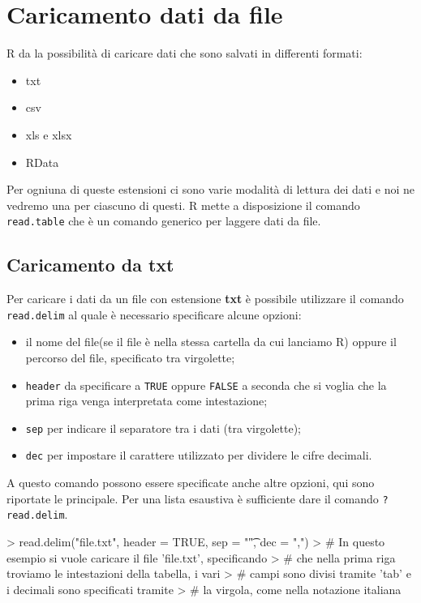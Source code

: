 \documentclass{article}
\begin{document}

\section{Caricamento dati da file}
R da la possibilità di caricare dati che sono salvati in differenti formati:
\begin{itemize}
  \item txt
  \item csv
  \item xls e xlsx
  \item RData
\end{itemize}
Per ogniuna di queste estensioni ci sono varie modalità di lettura dei dati e 
noi ne vedremo una per ciascuno di questi. R mette a disposizione il comando 
\texttt{read.table} che è un comando generico per laggere dati da file.

\subsection{Caricamento da txt}
Per caricare i dati da un file con estensione \textbf{txt} è possibile utilizzare
il comando \texttt{read.delim} al quale è necessario specificare alcune opzioni:
\begin{itemize}
  \item il nome del file(se il file è nella stessa cartella da cui lanciamo R)
  oppure il percorso del file, specificato tra virgolette;
  \item \texttt{header} da specificare a \texttt{TRUE} oppure \texttt{FALSE} a 
  seconda che si voglia che la prima riga venga interpretata come intestazione;
  \item \texttt{sep} per indicare il separatore tra i dati (tra virgolette);
  \item \texttt{dec} per impostare il carattere utilizzato per dividere le 
  cifre decimali.
\end{itemize}
A questo comando possono essere specificate anche altre opzioni, qui sono 
riportate le principale. Per una lista esaustiva è sufficiente dare il comando
\texttt{?read.delim}.

\begin{Schunk}
\begin{Sinput}
> read.delim("file.txt", header = TRUE, sep = "\t", dec = ",")
> # In questo esempio si vuole caricare il file 'file.txt', specificando 
> # che nella prima riga troviamo le intestazioni della tabella, i vari 
> # campi sono divisi tramite 'tab' e i decimali sono specificati tramite 
> # la virgola, come nella notazione italiana
\end{Sinput}
\end{Schunk}
\end{document}
